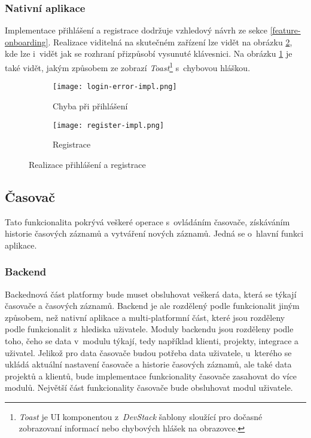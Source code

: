 \subsubsection{Nativní aplikace}

Implementace přihlášení a registrace dodržuje vzhledový návrh ze sekce \ref{feature-onboarding}. Realizace viditelná na skutečném zařízení lze vidět na obrázku \ref{fig:onboarding-impl}, kde lze i~vidět jak se rozhraní přizpůsobí vysunuté klávesnici. Na obrázku \ref{fig:login-error-impl} je také vidět, jakým způsobem ze zobrazí \emph{Toast}\footnote{\emph{Toast} je UI komponentou z~\emph{DevStack} šablony sloužící pro dočasné zobrazovaní informací nebo chybových hlášek na obrazovce.} s~chybovou hláškou.

\begin{figure}[h]
    \centering
    \begin{subfigure}[b]{0.4\textwidth}
		\centering
		\texttt{[image: login-error-impl.png]}
		\caption{Chyba při přihlášení}
		\label{fig:login-error-impl}
	\end{subfigure}
	\hspace{2cm}
	\begin{subfigure}[b]{0.4\textwidth}
		\centering
		\texttt{[image: register-impl.png]}
		\caption{Registrace}
	\end{subfigure}
	\caption{Realizace přihlášení a registrace}
	\label{fig:onboarding-impl}
\end{figure}

\subsection{Časovač}

Tato funkcionalita pokrývá veškeré operace s~ovládáním časovače, získáváním historie časových záznamů a vytváření nových záznamů. Jedná se o~hlavní funkci aplikace.

\subsubsection{Backend}

Backednová část platformy bude muset obsluhovat veškerá data, která se týkají časovače a časových záznamů. Backend je ale rozdělený podle funkcionalit jiným způsobem, než nativní aplikace a multi-platformní část, které jsou rozděleny podle funkcionalit z~hlediska uživatele. Moduly backendu jsou rozděleny podle toho, čeho se data v~modulu týkají, tedy například klienti, projekty, integrace a uživatel. Jelikož pro data časovače budou potřeba data uživatele, u~kterého se ukládá aktuální nastavení časovače a historie časových záznamů, ale také data projektů a klientů, bude implementace funkcionality časovače zasahovat do více modulů. Největší část funkcionality časovače bude obsluhovat modul uživatele. 

